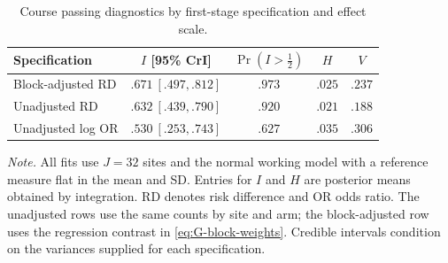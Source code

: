\begin{table}[!t]
\caption{Course passing diagnostics by first-stage specification and effect scale.}
\label{tab:G-ocrs-scale}
\centering
\begin{tablebody}
\begin{tabular}{@{}lcccc@{}}
\toprule
Specification & $I$ [95\% CrI] & $\Pr(I>\tfrac12)$ & $H$ & $V$ \\
\midrule
Block-adjusted RD & $.671\ [.497,.812]$ & $.973$ & $.025$ & $.237$ \\
\addlinespace[5pt]
Unadjusted RD & $.632\ [.439,.790]$ & $.920$ & $.021$ & $.188$ \\
\addlinespace[5pt]
Unadjusted log OR & $.530\ [.253,.743]$ & $.627$ & $.035$ & $.306$ \\
\bottomrule
\end{tabular}
\end{tablebody}
\par\vspace{0.4\baselineskip}
\begin{minipage}{\linewidth}\normalsize\doublespacing\raggedright
\textit{Note.} All fits use $J=32$ sites and the normal working model with a reference measure flat in the mean and SD. Entries for $I$ and $H$ are posterior means obtained by integration. RD denotes risk difference and OR odds ratio. The unadjusted rows use the same counts by site and arm; the block-adjusted row uses the regression contrast in \eqref{eq:G-block-weights}. Credible intervals condition on the variances supplied for each specification.
\end{minipage}
\end{table}
